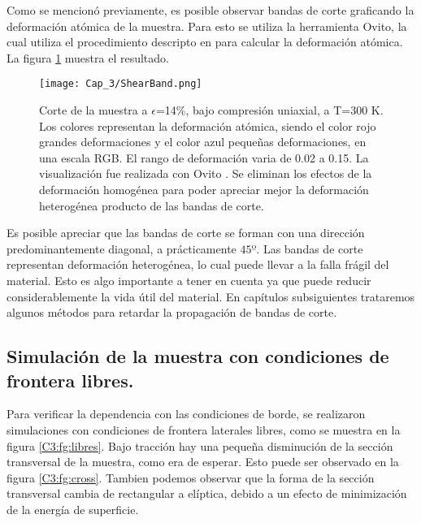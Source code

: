 Como se mencionó previamente, es posible observar bandas de corte graficando la deformación atómica de la muestra. Para esto se utiliza la herramienta Ovito, la cual utiliza el procedimiento descripto en \cite{shimizu07} para calcular la deformación atómica. La figura \ref{C3:fg:SBs} muestra el resultado.

\begin{figure}[htp]
\centering
\texttt{[image: Cap\_3/ShearBand.png]}
\caption[Corte de la muestra a $\epsilon$=14\%, bajo compresión uniaxial, a T=300 K.]{Corte de la muestra a $\epsilon$=14\%, bajo compresión uniaxial, a T=300 K. Los colores representan la deformación atómica, siendo el color rojo grandes deformaciones y el color azul pequeñas deformaciones, en una escala RGB. El rango de deformación varia de 0.02 a 0.15. La visualización fue realizada con Ovito \citep{stukowski10}. Se eliminan los efectos de la deformación homogénea para poder apreciar mejor la deformación heterogénea producto de las bandas de corte.}
\label{C3:fg:SBs}
\end{figure}

Es posible apreciar que las bandas de corte se forman con una dirección predominantemente diagonal, a prácticamente $45º$. Las bandas de corte representan deformación heterogénea, lo cual puede llevar a la falla frágil del material. Esto es algo importante a tener en cuenta ya que puede reducir considerablemente la vida útil del material. En capítulos subsiguientes trataremos algunos métodos para retardar la propagación de bandas de corte.

\subsection{Simulación de la muestra con condiciones de frontera libres.}

Para verificar la dependencia con las condiciones de borde, se realizaron simulaciones con condiciones de frontera laterales libres, como se muestra en la figura \ref{C3:fg:libres}. Bajo tracción hay una pequeña disminución de la sección transversal de la muestra, como era de esperar. Esto puede ser observado en la figura \ref{C3:fg:cross}. Tambien podemos observar que la forma de la sección transversal cambia de rectangular a elíptica, debido a un efecto de minimización de la energía de superficie.



